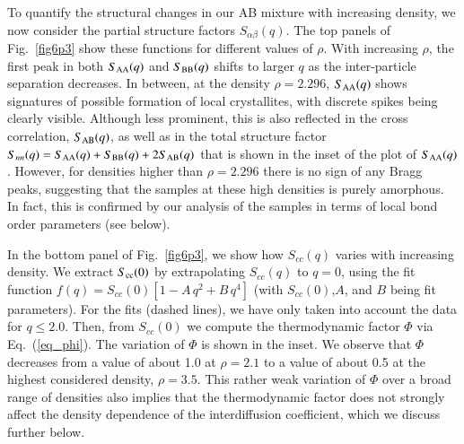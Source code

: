To quantify the structural changes in our AB mixture with increasing density, we now consider the partial structure factors $S_{\alpha\beta}(q)$. The top panels of Fig.~\ref{fig6p3} show these functions for different values of $\rho$.  With increasing $\rho$, the first peak in both $S_{\rm AA}(q)$ and $S_{\rm BB}(q)$ shifts to larger $q$ as the inter-particle separation decreases. In between, at the density $\rho = 2.296$, $S_{\rm AA}(q)$ shows signatures of possible formation of local crystallites, with discrete spikes being clearly visible. Although less prominent, this is also reflected in the cross correlation, $S_{\rm AB}(q)$, as well as in the total structure factor $S_{nn}(q) = S_{\rm AA}(q) + S_{\rm BB}(q) + 2 S_{\rm AB}(q)$ that is shown in the inset of the plot of $S_{\rm AA}(q)$. However, for densities higher than $\rho = 2.296$ there is no sign of any Bragg peaks, suggesting that the samples at these high densities is purely amorphous. In fact, this is confirmed by our analysis of the samples in terms of local bond order parameters (see below).

In the bottom panel of Fig.~\ref{fig6p3}, we show how $S_{cc}(q)$ varies with increasing density. We extract $S_{\rm cc}(0)$ by extrapolating $S_{cc}(q)$ to $q = 0$, using the fit function $f(q) = S_{cc}(0) [1 - A\, q^2 + B\, q^4]$ (with $S_{cc}(0)$,$A$, and $B$ being fit parameters). For the fits (dashed lines), we have only taken into account the data for $q \le 2.0$. Then, from $S_{cc}(0)$ we compute the thermodynamic factor $\Phi$ via Eq.~(\ref{eq_phi}). The variation of  $\Phi$ is shown in the inset.  We observe that $\Phi$ decreases from a value of about 1.0 at $\rho = 2.1$ to a value of about 0.5 at the highest considered density, $\rho = 3.5$.  This rather weak variation of $\Phi$ over a broad range of densities also implies that the thermodynamic factor does not strongly affect the density dependence of the interdiffusion coefficient, which we discuss further below.



